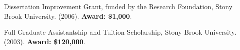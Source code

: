 \documentclass[12pt]{article}
\renewcommand{\section}[1]{\pagebreak[3]%
    \vspace{1.3\baselineskip}%
    \phantomsection\addcontentsline{toc}{section}{#1}%
    \noindent\llap{\scshape\smash{\parbox[t]{\marginparwidth}{\hyphenpenalty=10000\raggedright #1}}}%
    \vspace{-\baselineskip}\par}
\newcommand{\halfblankline}{\quad\vspace{-0.5\baselineskip}\pagebreak[3]}
\begin{document}
\begin{bibsection}
    	\item Dissertation Improvement Grant, funded by the Research Foundation, Stony Brook University. (2006). \textbf{Award: \$1,000}.
    
    	\item Full Graduate Assistantship and Tuition Scholarship, Stony Brook University. (2003).
	\textbf{Award: \$120,000}.
    

\end{bibsection}

\halfblankline

%





\end{document}
